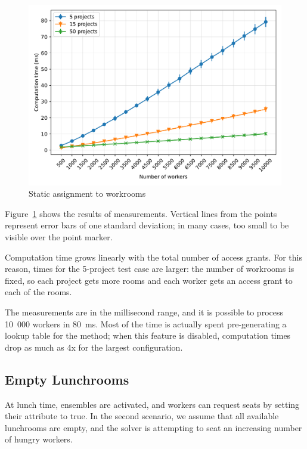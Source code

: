 \begin{figure}[ht]
    \centering
    \includegraphics[width=1\linewidth]{img/workers-simple.pdf}
    \caption{Static assignment to workrooms}
    \label{fig:workers-simple}
\end{figure}

Figure~\ref{fig:workers-simple} shows the results of measurements. Vertical lines from
the points represent error bars of one standard deviation; in many cases, too small to
be visible over the point marker.

Computation time grows linearly with the total number of access grants. For this reason,
times for the 5-project test case are larger: the number of workrooms is fixed, so each
project gets more rooms and each worker gets an access grant to each of the rooms.

The measurements are in the millisecond range, and it is possible to process 10~000
workers in 80~ms. Most of the time is actually spent pre-generating a lookup table for
the  method; when this feature is disabled, computation times drop as much
as 4x for the largest configuration.


\subsection{Empty Lunchrooms}
\label{eval:example:dynamic}

At lunch time,  ensembles are activated, and workers can request
seats by setting their  attribute to true. In the second scenario, we assume
that all available lunchrooms are empty, and the solver is attempting to seat an
increasing number of hungry workers.

